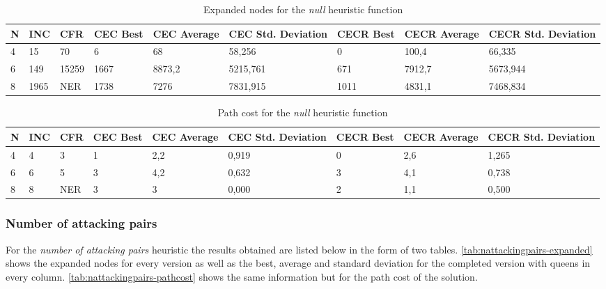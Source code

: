 \documentclass[]{llncs}
\begin{document}
\begin{table}[H]
    \caption{Expanded nodes for the \textit{null} heuristic function}
    \centering
    \resizebox{1 \textwidth}{!} { %
        \begin{tabular}{|l|l|l|l|l|l|l|l|l|}
            \hline
            N & INC & CFR & CEC Best & CEC Average & CEC Std. Deviation & CECR Best & CECR Average & CECR Std. Deviation \\ \hline
            4 & 15 & 70 & 6 & 68 & 58,256 & 0 & 100,4 & 66,335 \\
            6 & 149 & 15259 & 1667 & 8873,2 & 5215,761 & 671 & 7912,7 & 5673,944 \\
            8 & 1965 & NER & 1738 & 7276 & 7831,915 & 1011 & 4831,1 & 7468,834 \\ \hline
        \end{tabular}
        } %
        \label{tab:h0-expanded}
\end{table}

\begin{table}[H]
    \caption{Path cost for the \textit{null} heuristic function}
    \centering
    \resizebox{1 \textwidth}{!} { %
        \begin{tabular}{|l|l|l|l|l|l|l|l|l|}
        \hline
            N & INC & CFR & CEC Best & CEC Average & CEC Std. Deviation & CECR Best & CECR Average & CECR Std. Deviation \\ \hline
            4 & 4 & 3 & 1 & 2,2 & 0,919 & 0	& 2,6 & 1,265 \\
            6 & 6 & 5 & 3 & 4,2 & 0,632 & 3	& 4,1 & 0,738 \\
            8 & 8 & NER & 3 & 3 & 0,000 & 2	& 1,1 & 0,500 \\ \hline
    \end{tabular}
    } %
    \label{tab:h0-pathcost}
\end{table}
\subsubsection{Number of attacking pairs}
For the \textit{number of attacking pairs} heuristic the results obtained are listed below in the form of two tables. \ref{tab:nattackingpairs-expanded} shows the expanded nodes for every version as well as the best, average and standard deviation for the completed version with queens in every column. \ref{tab:nattackingpairs-pathcost} shows the same information but for the path cost of the solution.
\end{document}
